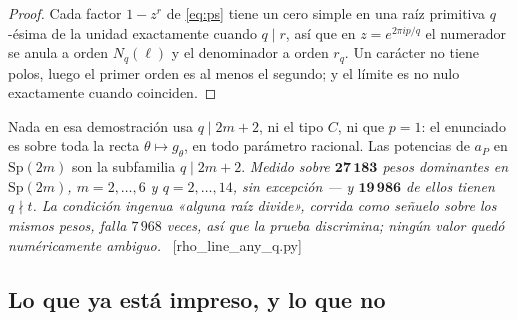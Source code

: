 \documentclass[11pt,a4paper]{article}
\newcommand{\Sp}{\mathrm{Sp}}
\newcommand{\ver}[1]{\unskip\penalty0\ \textcolor{azul}{\small\textsf{[#1]}}}
\begin{document}
\begin{proof}
Cada factor $1-z^{r}$ de \eqref{eq:ps} tiene un cero simple en una raíz primitiva $q$-ésima de la
unidad exactamente cuando $q\mid r$, así que en $z=e^{2\pi ip/q}$ el numerador se anula a orden
$N_q(\ell)$ y el denominador a orden $r_q$. Un carácter no tiene polos, luego el primer orden es
al menos el segundo; y el límite es no nulo exactamente cuando coinciden.
\end{proof}

\noindent Nada en esa demostración usa $q\mid 2m+2$, ni el tipo $C$, ni que $p=1$: el enunciado es
sobre toda la recta $\theta\mapsto g_\theta$, en todo parámetro racional. Las potencias de $a_P$ en
$\Sp(2m)$ son la subfamilia $q\mid 2m+2$. \emph{Medido sobre $\mathbf{27\,183}$ pesos dominantes en
$\Sp(2m)$, $m=2,\dots,6$ y $q=2,\dots,14$, sin excepción --- y $\mathbf{19\,986}$ de ellos tienen
$q\nmid t$. La condición ingenua «alguna raíz divide», corrida como señuelo sobre los mismos pesos,
falla $7\,968$ veces, así que la prueba discrimina; ningún valor quedó numéricamente ambiguo.}
\ver{rho\_line\_any\_q.py}

\subsection*{Lo que ya está impreso, y lo que no}
\end{document}
